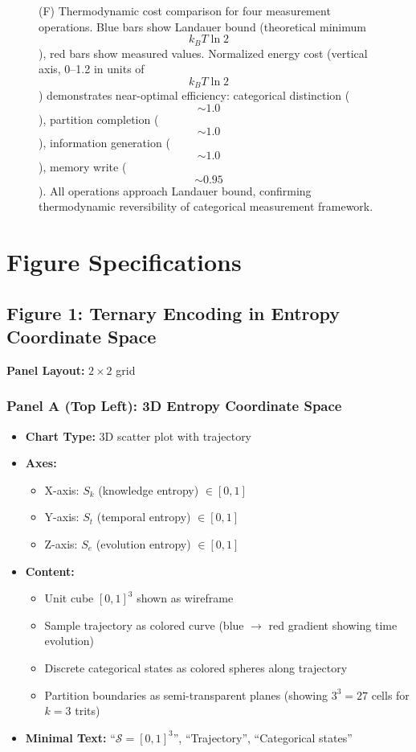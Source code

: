 \begin{figure}[htbp]
{          (F) Thermodynamic cost comparison for four measurement operations. Blue bars show Landauer bound (theoretical minimum $$k_B T \ln 2$$), red bars show measured values. Normalized energy cost (vertical axis, 0--1.2 in units of $$k_B T \ln 2$$) demonstrates near-optimal efficiency: categorical distinction ($$\sim 1.0$$), partition completion ($$\sim 1.0$$), information generation ($$\sim 1.0$$), memory write ($$\sim 0.95$$). All operations approach Landauer bound, confirming thermodynamic reversibility of categorical measurement framework.}
          \label{fig:information_catalysis}
          \end{figure}
          

\section*{Figure Specifications}


\subsection*{Figure 1: Ternary Encoding in Entropy Coordinate Space}

\textbf{Panel Layout:} $2 \times 2$ grid

\subsubsection*{Panel A (Top Left): 3D Entropy Coordinate Space}
\begin{itemize}
\item \textbf{Chart Type:} 3D scatter plot with trajectory
\item \textbf{Axes:}
  \begin{itemize}
  \item X-axis: $S_k$ (knowledge entropy) $\in [0,1]$
  \item Y-axis: $S_t$ (temporal entropy) $\in [0,1]$
  \item Z-axis: $S_e$ (evolution entropy) $\in [0,1]$
  \end{itemize}
\item \textbf{Content:}
  \begin{itemize}
  \item Unit cube $[0,1]^3$ shown as wireframe
  \item Sample trajectory as colored curve (blue $\to$ red gradient showing time evolution)
  \item Discrete categorical states as colored spheres along trajectory
  \item Partition boundaries as semi-transparent planes (showing $3^3 = 27$ cells for $k=3$ trits)
  \end{itemize}
\item \textbf{Minimal Text:} ``$\mathcal{S} = [0,1]^3$'', ``Trajectory'', ``Categorical states''
\end{itemize}


